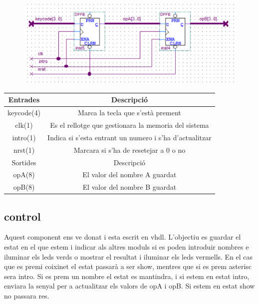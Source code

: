 \documentclass[12pt, a4papre]{article}
\begin{document}
	\begin{figure}[H]
		\begin{center}
		\includegraphics[width=130mm]{regs.png}
		\end{center}
	\end{figure}
	
	\begin{table}[h!]
		\centering
		 \begin{tabular}{|c | c|} 
			 \hline
			 Entrades & Descripció\\ [0.5ex] 
			 \hline
			 keycode(4) & Marca la tecla que s'està prement \\
			 clk(1) & Es el rellotge que gestionara la memoria del sistema\\
			 intro(1) & Indica si s'esta entrant un numero i s'ha d'actualitzar\\
			 nrst(1) & Marcara si s'ha de resetejar a 0 o no \\ [1ex] 
			 \hline\hline
			 Sortides & Descripció\\ [0.5ex] 
			 \hline
			 opA(8) & El valor del nombre A guardat\\
			 opB(8) & El valor del nombre B guardat\\
			 \hline
		 \end{tabular}
	\end{table}
	
	\subsection{control}
	
	Aquest component ens ve donat i esta escrit en vhdl. L'objectiu es guardar el estat en el que estem i indicar als altres moduls si es poden introduir nombres e iluminar els leds verds o mostrar el resultat i iluminar els leds vermells. En el cas que es premi coixinet el estat passarà a ser show, mentres que si es prem asterisc sera intro. Si es prem un nombre el estat es mantindra, i si estem en estat intro, enviara la senyal per a actualitzar els valors de opA i opB. Si estem en estat show no passara res.
	
\end{document}
